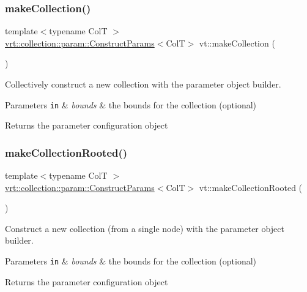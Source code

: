 \mbox{\label{namespacevt_a95c0d739e465e5324c2383f43ab2a145}} 
\subsubsection{\texorpdfstring{make\+Collection()}{makeCollection()}}
{\footnotesize\ttfamily template$<$typename ColT $>$ \\
\hyperlink{structvt_1_1vrt_1_1collection_1_1param_1_1_construct_params}{vrt\+::collection\+::param\+::\+Construct\+Params}$<$ColT$>$ vt\+::make\+Collection (\begin{DoxyParamCaption}{ }\end{DoxyParamCaption})}



Collectively construct a new collection with the parameter object builder. 


\begin{DoxyParams}[1]{Parameters}
\mbox{\tt in}  & {\em bounds} & the bounds for the collection (optional)\\
\hline
\end{DoxyParams}
\begin{DoxyReturn}{Returns}
the parameter configuration object 
\end{DoxyReturn}
\mbox{\label{namespacevt_a37806a29a810adceb5792f7cfd4de106}} 
\subsubsection{\texorpdfstring{make\+Collection\+Rooted()}{makeCollectionRooted()}}
{\footnotesize\ttfamily template$<$typename ColT $>$ \\
\hyperlink{structvt_1_1vrt_1_1collection_1_1param_1_1_construct_params}{vrt\+::collection\+::param\+::\+Construct\+Params}$<$ColT$>$ vt\+::make\+Collection\+Rooted (\begin{DoxyParamCaption}{ }\end{DoxyParamCaption})}



Construct a new collection (from a single node) with the parameter object builder. 


\begin{DoxyParams}[1]{Parameters}
\mbox{\tt in}  & {\em bounds} & the bounds for the collection (optional)\\
\hline
\end{DoxyParams}
\begin{DoxyReturn}{Returns}
the parameter configuration object 
\end{DoxyReturn}
\mbox{\label{namespacevt_a948c0bbe39c34326b5453065a461ebaa}} 
